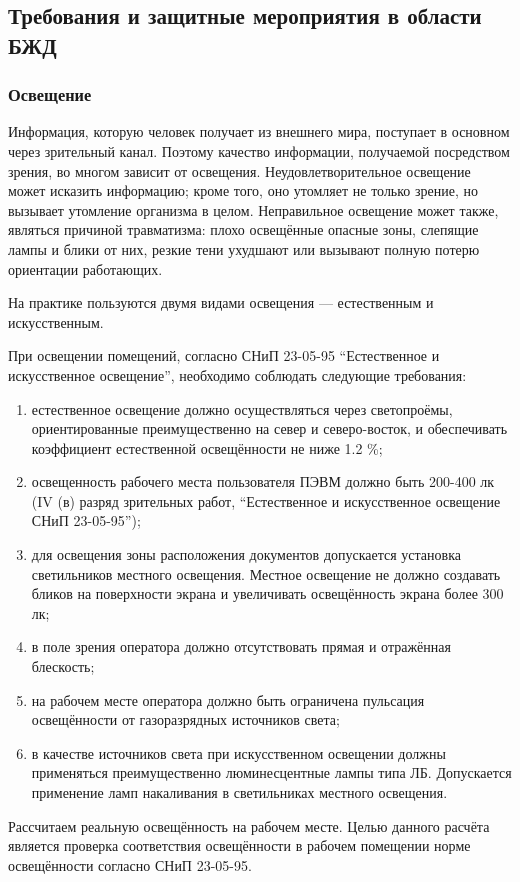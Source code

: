 \subsection{Требования и защитные мероприятия в области БЖД}
\subsubsection{Освещение}
Информация, которую человек получает из внешнего мира, поступает в основном через зрительный канал. Поэтому качество информации, получаемой посредством зрения, во многом зависит от освещения. Неудовлетворительное освещение может исказить информацию; кроме того, оно утомляет не только зрение, но вызывает утомление организма в целом. Неправильное освещение может также, являться причиной травматизма: плохо освещённые опасные зоны, слепящие лампы и блики от них, резкие тени ухудшают или вызывают полную потерю ориентации работающих.

На практике пользуются двумя видами освещения — естественным и искусственным.

При освещении помещений, согласно СНиП 23-05-95 ``Естественное и искусственное освещение'', необходимо соблюдать следующие требования:

\begin{enumerate}
\item естественное освещение должно осуществляться через светопроёмы, ориентированные преимущественно на север и северо-восток, и обеспечивать коэффициент естественной освещённости не ниже 1.2 \%;
\item освещенность рабочего места пользователя ПЭВМ должно быть 200-400 лк (IV (в) разряд зрительных работ, ``Естественное и искусственное освещение СНиП 23-05-95'');
\item для освещения зоны расположения документов допускается установка светильников местного освещения. Местное освещение не должно создавать бликов на поверхности экрана и увеличивать освещённость экрана более 300 лк;
\item в поле зрения оператора должно отсутствовать прямая и отражённая блескость;
\item на рабочем месте оператора должно быть ограничена пульсация освещённости от газоразрядных источников света;
\item в качестве источников света при искусственном освещении должны применяться преимущественно люминесцентные лампы типа ЛБ. Допускается применение ламп накаливания в светильниках местного освещения.
\end{enumerate}
Рассчитаем реальную освещённость на рабочем месте. Целью данного расчёта является проверка соответствия освещённости в рабочем помещении норме освещённости согласно СНиП 23-05-95.

